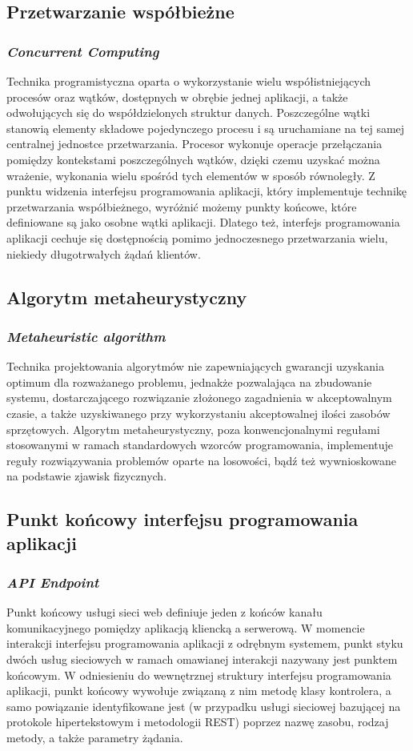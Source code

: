\subsection*{Przetwarzanie współbieżne}
\subsubsection{\textit{Concurrent Computing}}
Technika programistyczna oparta o wykorzystanie wielu współistniejących procesów oraz wątków, dostępnych w obrębie jednej aplikacji, a także odwołujących się do współdzielonych struktur danych. Poszczególne wątki stanowią elementy składowe pojedynczego procesu i są uruchamiane na tej samej centralnej jednostce przetwarzania. Procesor wykonuje operacje przełączania pomiędzy kontekstami poszczególnych wątków, dzięki czemu uzyskać można wrażenie, wykonania wielu spośród tych elementów w sposób równoległy. Z punktu widzenia interfejsu programowania aplikacji, który implementuje technikę przetwarzania współbieżnego, wyróżnić możemy punkty końcowe, które definiowane są jako osobne wątki aplikacji. Dlatego też, interfejs programowania aplikacji cechuje się dostępnością pomimo jednoczesnego przetwarzania wielu, niekiedy długotrwałych żądań klientów.

\subsection*{Algorytm metaheurystyczny}
\subsubsection{\textit{Metaheuristic algorithm}}
Technika projektowania algorytmów nie zapewniających gwarancji uzyskania optimum dla rozważanego problemu, jednakże pozwalająca na zbudowanie systemu, dostarczającego rozwiązanie złożonego zagadnienia w akceptowalnym czasie, a także uzyskiwanego przy wykorzystaniu akceptowalnej ilości zasobów sprzętowych. Algorytm metaheurystyczny, poza konwencjonalnymi regułami stosowanymi w ramach standardowych wzorców programowania, implementuje reguły rozwiązywania problemów oparte na losowości, bądź też wywnioskowane na podstawie zjawisk fizycznych.

\subsection*{Punkt końcowy interfejsu programowania aplikacji}
\subsubsection{\textit{API Endpoint}}
Punkt końcowy usługi sieci web definiuje jeden z końców kanału komunikacyjnego pomiędzy aplikacją kliencką a serwerową. W momencie interakcji interfejsu programowania aplikacji z odrębnym systemem, punkt styku dwóch usług sieciowych w ramach omawianej interakcji nazywany jest punktem końcowym. W odniesieniu do wewnętrznej struktury interfejsu programowania aplikacji, punkt końcowy wywołuje związaną z nim metodę klasy kontrolera, a samo powiązanie identyfikowane jest (w przypadku usługi sieciowej bazującej na protokole hipertekstowym i metodologii REST) poprzez nazwę zasobu, rodzaj metody, a także parametry żądania.

